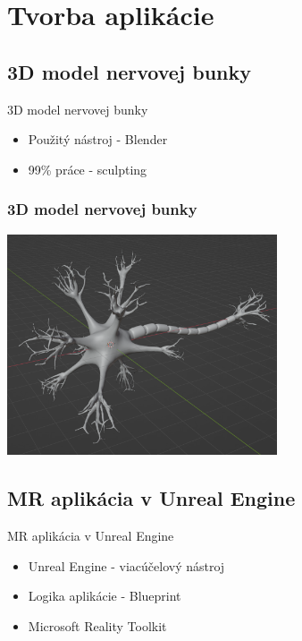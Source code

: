 \documentclass[pdf]{beamer}
\begin{document}
\section{Tvorba aplikácie}
\subsection{3D model nervovej bunky}
\begin{frame}{3D model nervovej bunky}
    \begin{itemize}
        \item Použitý nástroj - Blender
        \item 99\% práce - sculpting
    \end{itemize}
\end{frame}

\begin{frame}
    \frametitle{3D model nervovej bunky}    
    \begin{center}
        \includegraphics[width=8cm]{../img/finalModel-crop.png}
    \end{center}    
\end{frame}

\subsection{MR aplikácia v Unreal Engine}
\begin{frame}{MR aplikácia v Unreal Engine}
    \begin{itemize}
        \item Unreal Engine - viacúčelový nástroj
        \item Logika aplikácie - Blueprint        
        \item Microsoft Reality Toolkit
    \end{itemize}
\end{frame}
\end{document}
